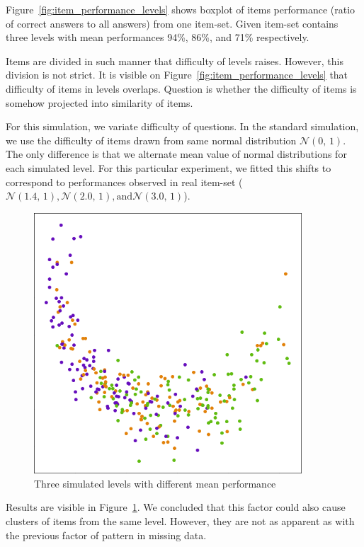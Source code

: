 \documentclass[
  print, %
  table,   %
  nolof,     %
  nolot,     %
  nocover,
  color,
  final,
]{fithesis3}
\begin{document}
Figure~\ref{fig:item_performance_levels} shows boxplot of items performance (ratio of correct answers to all answers) from one item-set. Given item-set contains three levels with mean performances 94\%, 86\%, and 71\% respectively.

Items are divided in such manner that difficulty of levels raises. However, this division is not strict. It is visible on Figure~\ref{fig:item_performance_levels} that difficulty of items in levels overlaps. Question is whether the difficulty of items is somehow projected into similarity of items.

For this simulation, we variate difficulty of questions. In the standard simulation, we use the difficulty of items drawn from same normal distribution $\mathcal{N}(0,\,1)$. The only difference is that we alternate mean value of normal distributions for each simulated level. For this particular experiment, we fitted this shifts to correspond to performances observed in real item-set ($\mathcal{N}(1.4,\,1), \mathcal{N}(2.0,\,1), \text{and} \mathcal{N}(3.0,\,1)$).

\begin{figure}
  \includegraphics[width=10cm]{img/simulated_performance}
  \caption{Three simulated levels with different mean performance}
  \label{fig:simulated_performance}
\end{figure}


Results are visible in Figure~\ref{fig:simulated_performance}. We concluded that this factor could also cause clusters of items from the same level. However, they are not as apparent as with the previous factor of pattern in missing data.
\end{document}
